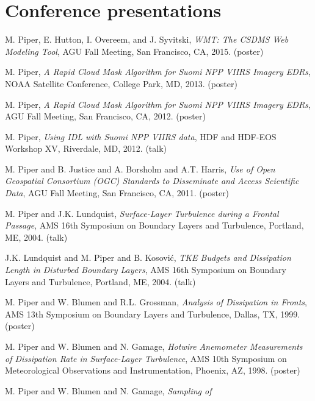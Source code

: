 \documentclass[letterpaper]{resume}
\begin{document}

\section{Conference presentations}

\vspace{1.0em}
\begin{enumerate}[{[}1{]}]
  \item M. Piper, E. Hutton, I. Overeem, and J. Syvitski, 
    \textit{{WMT}: The {CSDMS} Web Modeling Tool}, {AGU Fall Meeting},
           {San Francisco, CA}, 2015. (poster)
  \item {M. Piper}, \textit{A Rapid Cloud Mask Algorithm for {Suomi}
    {NPP} {VIIRS} {Imagery} {EDRs}}, {NOAA Satellite Conference},
    {College Park, MD}, 2013. (poster)
  \item {M. Piper}, \textit{A Rapid Cloud Mask Algorithm for {Suomi} {NPP}
    {VIIRS} {Imagery} {EDRs}}, {AGU Fall Meeting}, {San Francisco,
    CA}, 2012. (poster)
  \item {M. Piper}, \textit{Using IDL with {Suomi} {NPP} {VIIRS}
    data}, {HDF and HDF-EOS Workshop XV}, {Riverdale, MD}, 2012. (talk)
  \item {M. Piper and B. Justice and A. Borsholm and A.T. Harris},
    \textit{Use of Open Geospatial Consortium (OGC) Standards to
      Disseminate and Access Scientific Data}, {AGU Fall Meeting},
      {San Francisco, CA}, 2011. (poster)
  \item {M. Piper and J.K. Lundquist}, \textit{Surface-Layer
    Turbulence during a Frontal Passage}, {AMS 16th Symposium on
    Boundary Layers and Turbulence}, {Portland, ME}, 2004. (talk)
  \item {J.K. Lundquist and M. Piper and B. Kosovi{\'c}}, \textit{TKE
    Budgets and Dissipation Length in Disturbed Boundary Layers}, {AMS
    16th Symposium on Boundary Layers and Turbulence}, {Portland, ME},
    2004. (talk)
  \item {M. Piper and W. Blumen and R.L. Grossman}, \textit{Analysis
    of Dissipation in Fronts}, {AMS 13th Symposium on Boundary Layers
    and Turbulence}, {Dallas, TX}, 1999. (poster)
  \item {M. Piper and W. Blumen and N. Gamage}, \textit{Hotwire
    Anemometer Measurements of Dissipation Rate in Surface-Layer
    Turbulence}, {AMS 10th Symposium on Meteorological Observations
    and Instrumentation}, {Phoenix, AZ}, 1998. (poster)
  \item {M. Piper and W. Blumen and N. Gamage}, \textit{Sampling of
}
\end{enumerate}
\end{document}
